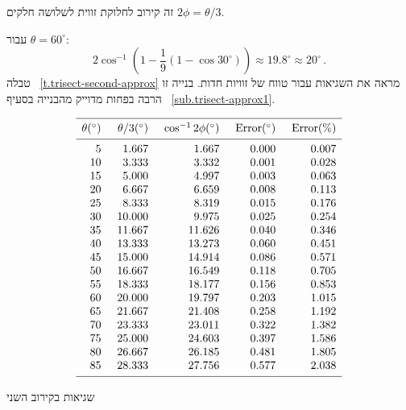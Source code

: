 זה קירוב לחלוקת זווית לשלושה חלקים
$2\phi=\theta/3$.

עבור
$\theta=60^\circ$:
\[
2\cos^{-1}\left(1 - \frac{1}{9}(1-\cos 30^\circ)\right)\approx 19.8^\circ\approx 20^\circ\,.
\]
טבלה%
~\ref{t.trisect-second-approx}
מראה את השגיאות עבור טווח של זוויות חדות. בנייה זו הרבה בפחות מדוייק מהבנייה בסעיף%
~\ref{sub.trisect-approx1}.

\begin{table}[t]
\[
\begin{array}{r@{\hspace{5mm}}r@{\hspace{5mm}}r@{\hspace{5mm}}r@{\hspace{5mm}}r}
\hline
\noalign{\smallskip}
\theta ({}^\circ) & \theta/3 ({}^\circ)& \cos^{-1} 2\phi ({}^\circ) & \mathrm{Error} ({}^\circ) & \mathrm{Error (\%)}\\
\noalign{\smallskip}\hline\noalign{\smallskip}
  5 &    1.667 &    1.667  &     0.000 &    0.007 \\
 10 &    3.333 &    3.332  &     0.001 &    0.028 \\
 15 &    5.000 &    4.997  &     0.003 &    0.063 \\
 20 &    6.667 &    6.659  &     0.008 &    0.113 \\
 25 &    8.333 &    8.319  &     0.015 &    0.176 \\
 30 &   10.000 &    9.975  &     0.025 &    0.254 \\
 35 &   11.667 &   11.626  &     0.040 &    0.346 \\
 40 &   13.333 &   13.273  &     0.060 &    0.451 \\
 45 &   15.000 &   14.914  &     0.086 &    0.571 \\
 50 &   16.667 &   16.549  &     0.118 &    0.705 \\
 55 &   18.333 &   18.177  &     0.156 &    0.853 \\
 60 &   20.000 &   19.797  &     0.203 &    1.015 \\
 65 &   21.667 &   21.408  &     0.258 &    1.192 \\
 70 &   23.333 &   23.011  &     0.322 &    1.382 \\
 75 &   25.000 &   24.603  &     0.397 &    1.586 \\
 80 &   26.667 &   26.185  &     0.481 &    1.805 \\
 85 &   28.333 &   27.756  &     0.577 &    2.038 \\
 \noalign{\smallskip}
 \hline
 \end{array}
\]
\caption{שגיאות בקירוב השני}
\label{t.trisect-second-approx}
\end{table}

